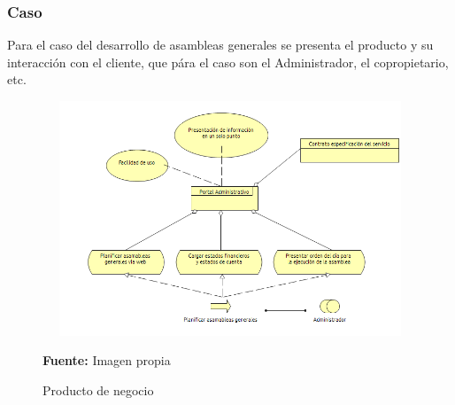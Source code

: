 \subsubsection{Caso}

Para el caso del desarrollo de asambleas generales se presenta el producto y su interacción con el cliente, que pára el caso son el Administrador, el copropietario, etc.

\begin{figure}[th!]
	\centering
	\includegraphics[width=12cm,height=7cm]{arquitectura/negocio/imgs/producto.png}
	\caption{Producto de negocio}{\scriptsize \textbf{Fuente:} Imagen propia}
\end{figure}
\newpage